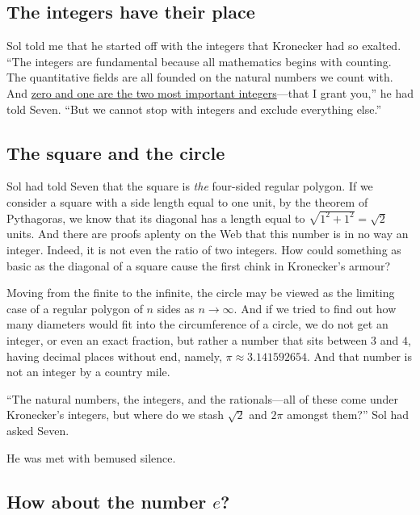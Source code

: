 \documentclass[
  a4paper,
]{article}
\begin{document}
\subsection{The integers have their
place}\label{the-integers-have-their-place}

Sol told me that he started off with the integers that Kronecker had so
exalted. ``The integers are fundamental because all mathematics begins
with counting. The quantitative fields are all founded on the natural
numbers we count with. And
\href{https://swanlotus.netlify.app/blogs/the-two-most-important-numbers-zero-and-one}{zero
and one are the two most important integers}---that I grant you,'' he
had told Seven. ``But we cannot stop with integers and exclude
everything else.''

\subsection{The square and the circle}\label{the-square-and-the-circle}

Sol had told Seven that the square is \emph{the} four-sided regular
polygon. If we consider a square with a side length equal to one unit,
by the theorem of Pythagoras, we know that its diagonal has a length
equal to \(\sqrt{1^2 + 1^2} = \sqrt{2}\) units. And there are proofs
aplenty on the Web that this number is in no way an integer. Indeed, it
is not even the ratio of two integers. How could something as basic as
the diagonal of a square cause the first chink in Kronecker's armour?

Moving from the finite to the infinite, the circle may be viewed as the
limiting case of a regular polygon of \(n\) sides as \(n \to \infty\).
And if we tried to find out how many diameters would fit into the
circumference of a circle, we do not get an integer, or even an exact
fraction, but rather a number that sits between \(3\) and \(4\), having
decimal places without end, namely, \(\pi \approx 3.141592654\). And
that number is not an integer by a country mile.

``The natural numbers, the integers, and the rationals---all of these
come under Kronecker's integers, but where do we stash \(\sqrt{2}\) and
\(2\pi\) amongst them?'' Sol had asked Seven.

He was met with bemused silence.

\subsection{\texorpdfstring{How about the number
\(e\)?}{How about the number e?}}\label{how-about-the-number-e}
\end{document}
